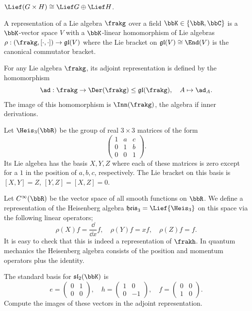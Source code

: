 \begin{example}
    $\Lief (G\times H)\cong \Lief G\oplus \Lief H$.
\end{example}


\begin{defn}
    A representation of a Lie algebra $\frakg$ over a field $\bbK\in \{\bbR,\bbC\}$ is a $\bbK$-vector space $V$ with a $\bbK$-linear homomorphism of Lie algebras $\rho:(\frakg,[\cdot,\cdot])\to \mathfrak{gl}(V)$ where the Lie bracket on $\mathfrak{gl}(V)\cong \End(V)$ is the canonical commutator bracket.
\end{defn}

\begin{defn}
    For any Lie algebra $\frakg$, its adjoint representation is defined by the homomorphism
    \[\ad:\frakg\to \Der(\frakg)\leq \mathfrak{gl}(\frakg),\quad A\mapsto \ad_A.\]
    The image of this homomorphism is $\Inn(\frakg)$, the algebra if inner derivations.
\end{defn}


\begin{example}\label{example Heisenberg group}
    Let $\Heis_3(\bbR)$ be the group of real $3\times 3$ matrices of the form
    \[\begin{pmatrix}
        1&a&c\\0&1&b\\0&0&1
    \end{pmatrix}.\]
    Its Lie algebra has the basis $X,Y,Z$ where each of these matrices is zero except for a $1$ in the position of $a,b,c$, respectively. The Lie bracket on this basis is $[X,Y]=Z$, $[Y,Z]=[X,Z]=0$.
    
    Let $C^\infty(\bbR)$ be the vector space of all smooth functions on $\bbR$. We define a representation of the Heisenberg algebra $\mathfrak{heis}_3=\Lief{\Heis_3}$ on this space via the following linear operators;
    \[\rho(X)f=\frac{\dd}{\dd x}f,\quad \rho(Y)f=xf,\quad \rho(Z)f=f.\]
    It is easy to check that this is indeed a representation of $\frakh$. In quantum mechanics the Heisenberg algebra consists of the position and momentum operators plus the identity.
\end{example}

\begin{xca}
    The standard basis for $\mathfrak{sl}_2(\bbK)$ is 
    \[e=\begin{pmatrix}
        0&1\\0&0
    \end{pmatrix},\quad h=\begin{pmatrix}
        1&0\\0&-1
    \end{pmatrix},
    \quad f=\begin{pmatrix}
        0&0\\1&0
    \end{pmatrix}.\]
    Compute the images of these vectors in the adjoint representation.
\end{xca}

